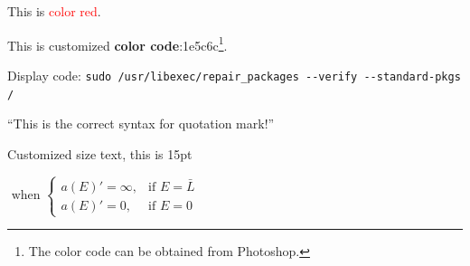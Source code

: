\documentclass[12pt, letterpaper, oneside]{article}
\begin{document}
This is \textcolor{red}{color red}.

{\color{darkGreen}This is customized \textbf{color code}:1e5c6c\footnote{The color code can be obtained from Photoshop.}.}\\

\begin{flushleft}
    Display code:  \verb|sudo /usr/libexec/repair_packages --verify --standard-pkgs /|
\end{flushleft}

``This is the correct syntax for quotation mark!''

\newpage

{\fontsize{15}{11}\selectfont Customized size text, this is 15pt}

\vspace*{1cm}

$\text{ when }
\begin{cases}
    a(E)'=\infty, &\text{if $E=\bar{L}$} \\
    a(E)'=0, &\text{if $E=0$}
\end{cases}
$

\vspace*{1cm}
\end{document}
